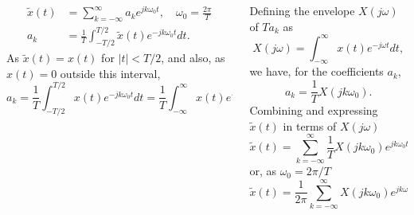 \begin{frame}


    \begin{columns}[T]
        \begin{column}{0.5\textwidth}
                 
            \begin{align*}
                \tilde{x}(t) &= \sum_{k=-\infty}^{\infty}a_ke^{jk\omega_0 t},\quad \omega_0 =\frac{2\pi}{T}\\
                a_k &= \frac{1}{T}\int_{-T/2}^{T/2}\tilde{x}(t)e^{-jk\omega_0 t}dt.
            \end{align*}
            As $\tilde{x}(t) = x(t)$ for $|t| < T/2$, and also, as $x(t) = 0$ outside this interval,
            \begin{equation*}
                a_k = \frac{1}{T}\int_{-T/2}^{T/2}x(t)e^{-jk\omega_0 t}dt = \frac{1}{T}\int_{-\infty}^{\infty}x(t)e^{-jk\omega_0 t}dt.
            \end{equation*}
        \end{column}
        \begin{column}{0.5\textwidth}
            Defining the envelope $X(j\omega)$ of $Ta_k$ as        
            \begin{equation*}
                X(j\omega) = \int_{-\infty}^{\infty}x(t)e^{-j\omega t}dt,
            \end{equation*}
            we have, for the coefficients $a_k$, 
            \begin{equation*}
                a_k = \frac{1}{T}X(jk\omega_0).
            \end{equation*}
            Combining and expressing $\tilde{x}(t)$ in terms of $X(j\omega)$
            \begin{equation*}
                \tilde{x}(t) = \sum_{k=-\infty}^{\infty} \frac{1}{T}X(jk\omega_0)e^{jk\omega_0 t},
            \end{equation*}        
            or, as $\omega_0 =2\pi/T$    
            \begin{equation}
                \label{eq:xtildet_with_ft}
                \tilde{x}(t) = \frac{1}{2\pi}\sum_{k=-\infty}^{\infty} X(jk\omega_0)e^{jk\omega_0 t}\omega_0.
            \end{equation}             
        \end{column}        
    \end{columns}
\end{frame}


